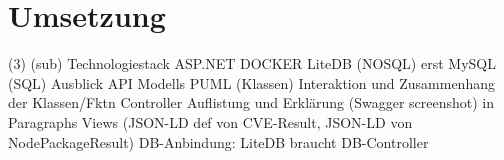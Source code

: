 \section{Umsetzung} \label{sec:Umsetzung}
    (3)
    (sub)
    Technologiestack
        ASP.NET
        DOCKER
        LiteDB (NOSQL) erst
        MySQL (SQL) Ausblick
    API
        Modells
            PUML (Klassen)
            Interaktion und Zusammenhang der Klassen/Fktn
        Controller
            Auflistung und Erklärung (Swagger screenshot) in Paragraphs
            Views (JSON-LD def von CVE-Result, JSON-LD von NodePackageResult)
        DB-Anbindung: LiteDB braucht DB-Controller
        